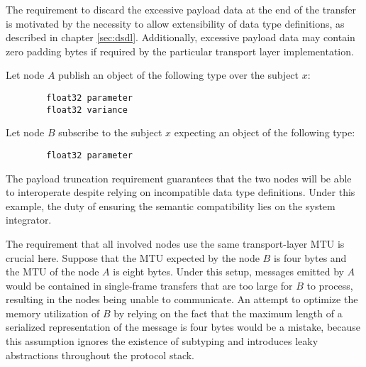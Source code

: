 \begin{remark}[breakable]
    The requirement to discard the excessive payload data at the end of the transfer is motivated by
    the necessity to allow extensibility of data type definitions, as described in chapter \ref{sec:dsdl}.
    Additionally, excessive payload data may contain zero padding bytes if required by the particular
    transport layer implementation.

    Let node $A$ publish an object of the following type over the subject $x$:

    \begin{verbatim}
        float32 parameter
        float32 variance
    \end{verbatim}

    Let node $B$ subscribe to the subject $x$ expecting an object of the following type:

    \begin{verbatim}
        float32 parameter
    \end{verbatim}

    The payload truncation requirement guarantees that the two nodes will be able to interoperate despite
    relying on incompatible data type definitions.
    Under this example, the duty of ensuring the semantic compatibility lies on the system integrator.

    The requirement that all involved nodes use the same transport-layer MTU is crucial here.
    Suppose that the MTU expected by the node $B$ is four bytes and the MTU of the node $A$ is eight bytes.
    Under this setup, messages emitted by $A$ would be contained in single-frame transfers that are too large
    for $B$ to process, resulting in the nodes being unable to communicate.
    An attempt to optimize the memory utilization of $B$ by relying on the fact that the maximum length of a
    serialized representation of the message is four bytes would be a mistake, because this assumption ignores
    the existence of subtyping and introduces leaky abstractions throughout the protocol stack.
\end{remark}

